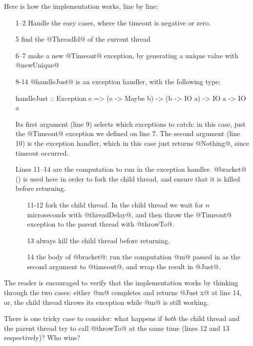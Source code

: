 Here is how the implementation works, line by line:

\begin{itemize}
\item[1--2] Handle the easy cases, where the timeout is
  negative or zero.
\item[5] find the @ThreadId@ of the current thread
\item[6--7] make a new @Timeout@ exception, by generating a unique value
  with @newUnique@
\item[8-14] @handleJust@ is an exception handler, with the following
  type:
\begin{haskell}
handleJust :: Exception e
           => (e -> Maybe b) -> (b -> IO a) -> IO a
           -> IO a
\end{haskell}
  Its first argument (line 9) selects which exceptions to catch: in
  this case, just the @Timeout@ exception we defined on line 7.  The
  second argument (line 10) is the exception handler, which in this
  case just returns @Nothing@, since timeout occurred.

  Lines 11--14 are the computation to run in the exception handler.
  @bracket@ () is used here in order to fork
  the child thread, and ensure that it is killed before returning.

  \begin{itemize}
    \item[11-12] fork the child thread.  In the child thread we wait
      for $n$ microseconds with @threadDelay@, and then throw the
      @Timeout@ exception to the parent thread with @throwTo@.
    \item [13] always kill the child thread before returning.
    \item [14] the body of @bracket@: run the computation @m@ passed
      in as the second argument to @timeout@, and wrap the result in
      @Just@.
  \end{itemize}
\end{itemize}

The reader is encouraged to verify that the implementation works by
thinking through the two cases: either @m@ completes and returns
@Just x@ at line 14, or, the child thread throws its exception while
@m@ is still working.

There is one tricky case to consider: what happens if \emph{both} the
child thread and the parent thread try to call @throwTo@ at the same
time (lines 12 and 13 respectively)?  Who wins?


